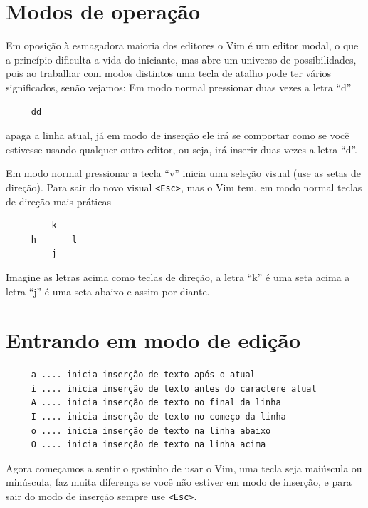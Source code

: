 \documentclass[10pt,a4paper,openany]{book}
\begin{document}
\section{Modos de operação}\label{Modos de operação}

Em oposição à esmagadora maioria dos editores o Vim é um editor modal, o que a
princípio dificulta a vida do iniciante, mas abre um universo de
possibilidades, pois ao trabalhar com modos distintos uma tecla de
atalho pode ter vários significados, senão vejamos:
Em modo normal pressionar duas vezes a letra ``d''
\begin{verbatim}
     dd
\end{verbatim}
apaga a linha atual, já em modo de inserção ele irá se comportar como se você estivesse
usando qualquer outro editor, ou seja, irá inserir duas vezes a letra ``d''.

Em modo normal pressionar a tecla ``v'' inicia uma seleção visual (use as setas de direção).
Para sair do novo visual \verb|<Esc>|, mas o Vim tem, em modo normal teclas de direção mais práticas

\begin{verbatim}
         k
     h       l
         j
\end{verbatim}

Imagine as letras acima como teclas de direção, a letra ``k'' é uma seta acima
a letra ``j'' é uma seta abaixo e assim por diante.



\section{Entrando em modo de edição}
\label{Entrando em modo de edição}

\begin{verbatim}
     a .... inicia inserção de texto após o atual
     i .... inicia inserção de texto antes do caractere atual
     A .... inicia inserção de texto no final da linha
     I .... inicia inserção de texto no começo da linha
     o .... inicia inserção de texto na linha abaixo
     O .... inicia inserção de texto na linha acima
\end{verbatim}

Agora começamos a sentir o gostinho de usar o Vim, uma tecla seja
maiúscula ou minúscula, faz muita diferença se você não estiver em
modo de inserção, e para sair do modo de inserção sempre use \verb|<Esc>|.
\end{document}

